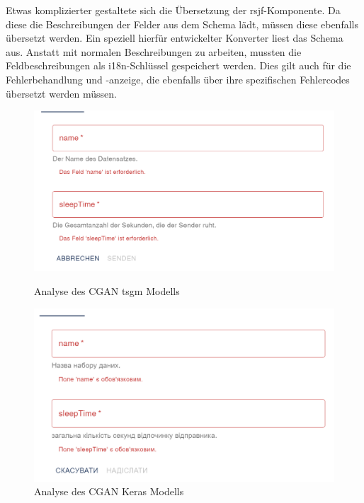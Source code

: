 Etwas komplizierter gestaltete sich die Übersetzung der rsjf-Komponente. Da diese die Beschreibungen der Felder aus dem Schema lädt, müssen diese 
ebenfalls übersetzt werden. Ein speziell hierfür entwickelter Konverter liest das Schema aus. Anstatt mit normalen Beschreibungen zu arbeiten, mussten die 
Feldbeschreibungen als i18n-Schlüssel gespeichert werden. Dies gilt auch für die Fehlerbehandlung und -anzeige, die ebenfalls über ihre spezifischen Fehlercodes übersetzt werden müssen.
\begin{figure}[ht]
    \centering
    \begin{minipage}{0.5\textwidth}
        \centering
        \includegraphics[width=\textwidth]{includes/figures/new_version/rsjf_translation_1.png}
        \caption{Analyse des CGAN tsgm Modells}
        \label{fig:rsjf_translation_1}
    \end{minipage}\hfill
    \begin{minipage}{0.5\textwidth}
        \centering
        \includegraphics[width=\textwidth]{includes/figures/new_version/rsjf_translation_2.png}
        \caption{Analyse des CGAN Keras Modells}
        \label{fig:rsjf_translation_2}
    \end{minipage}
\end{figure}


